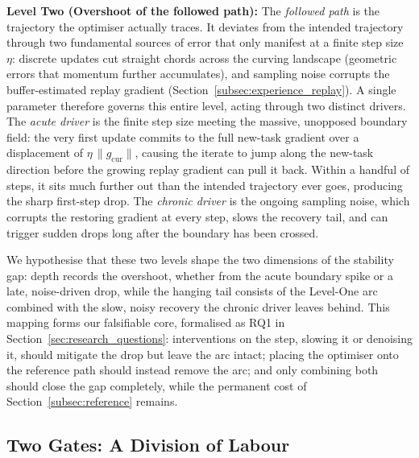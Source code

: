 \textbf{Level Two (Overshoot of the followed path):} The \emph{followed path} is the trajectory the optimiser actually traces. It deviates from the intended trajectory through two fundamental sources of error that only manifest at a finite step size $\eta$: discrete updates cut straight chords across the curving landscape (geometric errors that momentum further accumulates), and sampling noise corrupts the buffer-estimated replay gradient (Section~\ref{subsec:experience_replay}). A single parameter therefore governs this entire level, acting through two distinct drivers. The \emph{acute driver} is the finite step size meeting the massive, unopposed boundary field: the very first update commits to the full new-task gradient over a displacement of $\eta\,\lVert g_{\text{cur}} \rVert$, causing the iterate to jump along the new-task direction before the growing replay gradient can pull it back. Within a handful of steps, it sits much further out than the intended trajectory ever goes, producing the sharp first-step drop. The \emph{chronic driver} is the ongoing sampling noise, which corrupts the restoring gradient at every step, slows the recovery tail, and can trigger sudden drops long after the boundary has been crossed.

We hypothesise that these two levels shape the two dimensions of the stability gap: depth records the overshoot, whether from the acute boundary spike or a late, noise-driven drop, while the hanging tail consists of the Level-One arc combined with the slow, noisy recovery the chronic driver leaves behind. This mapping forms our falsifiable core, formalised as RQ1 in Section~\ref{sec:research_questions}: interventions on the step, slowing it or denoising it, should mitigate the drop but leave the arc intact; placing the optimiser onto the reference path should instead remove the arc; and only combining both should close the gap completely, while the permanent cost of Section~\ref{subsec:reference} remains.

\subsection{Two Gates: A Division of Labour}
\label{subsec:gates}

